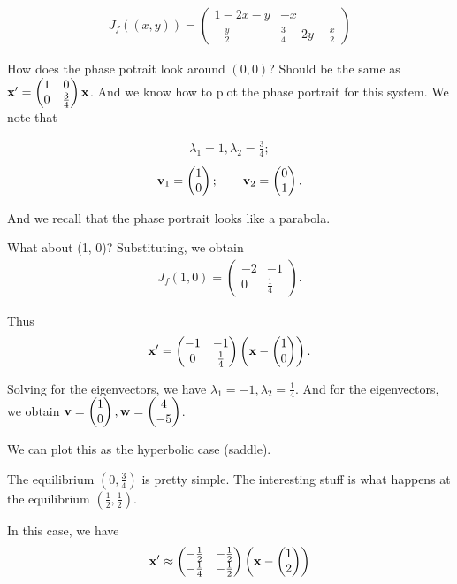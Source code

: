 \documentclass{article}
\newcommand{\mat}[1]{\begin{pmatrix}#1\end{pmatrix}}
\begin{document}
\begin{align*}
  J_f( (x, y) ) = \mat{1 - 2x -y & -x \\ -\frac{y}{2} & \frac{3}{4} - 2y - \frac{x}{2}}
\end{align*}

How does the phase potrait look around $(0, 0)$?  Should be the same as $\mbf{x}' = \mat{1 & 0 \\ 0 & \frac{3}{4}} \mbf{x}$.  And we know how to plot the phase portrait for this system.  We note that

\begin{align*}
  \lambda_1 = 1, \lambda_2 = \frac{3}{4};
\end{align*}
\begin{align*}
  \mbf{v}_1 = \mat{1 \\ 0}; \qquad \mbf{v}_2 = \mat{0 \\ 1}.
\end{align*}

And we recall that the phase portrait looks like a parabola.

What about (1, 0)?  Substituting, we obtain
\begin{align*}
  J_f(1, 0) = \mat{-2 & -1 \\ 0 & \frac{1}{4}}.
\end{align*}

Thus
\begin{align*}
  \mbf{x}' = \mat{-1 & -1 \\ 0 & \frac{1}{4}} \mat{ \mbf{x} - \mat{1 \\ 0}}.
\end{align*}

Solving for the eigenvectors, we have $\lambda_1 = -1, \lambda_2 = \frac{1}{4}$.  And for the eigenvectors, we obtain $\mbf{v} = \mat{1 \\ 0}, \mbf{w} = \mat{4 \\ -5}$.

We can plot this as the hyperbolic case (saddle).

The equilibrium $(0, \frac{3}{4})$ is pretty simple.  The interesting stuff is what happens at the equilibrium $(\frac{1}{2}, \frac{1}{2})$.

In this case, we have
\begin{align*}
  \mbf{x}' \approx \mat{- \frac{1}{2} & - \frac{1}{2} \\ - \frac{1}{4} & - \frac{1}{2}} \mat{\mbf{x} - \mat{1 \\ 2}}
\end{align*}
\end{document}
